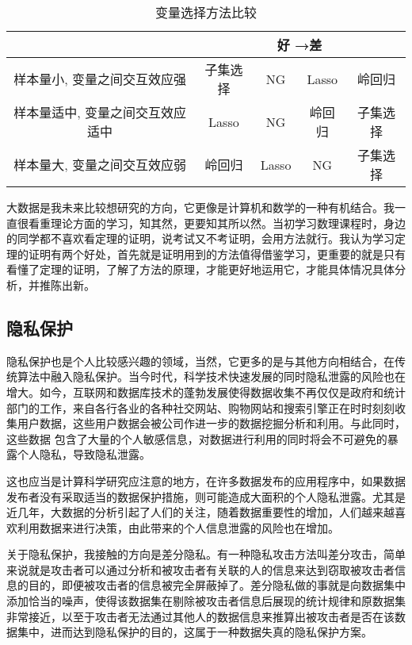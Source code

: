\documentclass{article}
\begin{document}
\begin{table}[h]
    \centering
    \caption{变量选择方法比较}
\begin{tabular}{c|cccc}

    \hline
   &\multicolumn{4}{c}{好 →差}   \\
    \hline
样本量小, 变量之间交互效应强 &  子集选择  &   NG  & Lasso & 岭回归  \\
 样本量适中, 变量之间交互效应适中  &  Lasso  &  NG  &  岭回归  & 子集选择  \\
样本量大, 变量之间交互效应弱  & 岭回归  &  Lasso &  NG  & 子集选择 \\
\hline
    
    
    
    
    \hline
\end{tabular}
    \label{table1}
\end{table}



\par
大数据是我未来比较想研究的方向，它更像是计算机和数学的一种有机结合。我一直很看重理论方面的学习，知其然，更要知其所以然。当初学习数理课程时，身边的同学都不喜欢看定理的证明，说考试又不考证明，会用方法就行。我认为学习定理的证明有两个好处，首先就是证明用到的方法值得借鉴学习，更重要的就是只有看懂了定理的证明，了解了方法的原理，才能更好地运用它，才能具体情况具体分析，并推陈出新。












\subsection{隐私保护}
隐私保护也是个人比较感兴趣的领域，当然，它更多的是与其他方向相结合，在传统算法中融入隐私保护。当今时代，科学技术快速发展的同时隐私泄露的风险也在增大。如今，互联网和数据库技术的蓬勃发展使得数据收集不再仅仅是政府和统计部门的工作，来自各行各业的各种社交网站、购物网站和搜索引擎正在时时刻刻收集用户数据，这些用户数据会被公司作进一步的数据挖掘分析和利用。与此同时，这些数据
包含了大量的个人敏感信息，对数据进行利用的同时将会不可避免的暴露个人隐私，导致隐私泄露。\par
这也应当是计算科学研究应注意的地方，在许多数据发布的应用程序中，如果数据发布者没有采取适当的数据保护措施，则可能造成大面积的个人隐私泄露。尤其是近几年，大数据的分析引起了人们的关注，随着数据重要性的增加，人们越来越喜欢利用数据来进行决策，由此带来的个人信息泄露的风险也在增加。\par
关于隐私保护，我接触的方向是差分隐私。有一种隐私攻击方法叫差分攻击，简单来说就是攻击者可以通过分析和被攻击者有关联的人的信息来达到窃取被攻击者信息的目的，即便被攻击者的信息被完全屏蔽掉了。差分隐私做的事就是向数据集中添加恰当的噪声，使得该数据集在剔除被攻击者信息后展现的统计规律和原数据集非常接近，以至于攻击者无法通过其他人的数据信息来推算出被攻击者是否在该数据集中，进而达到隐私保护的目的，这属于一种数据失真的隐私保护方案。
\end{document}
